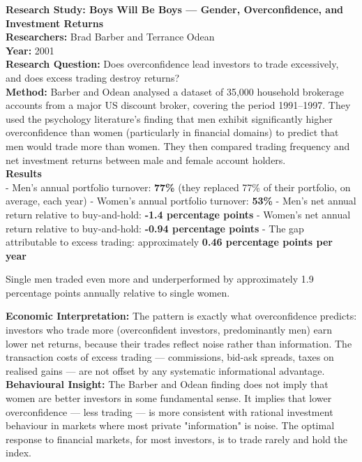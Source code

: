 \documentclass[12pt, letterpaper]{article}
\begin{document}
\begin{researchbox}
\textbf{Research Study: Boys Will Be Boys --- Gender, Overconfidence, and Investment Returns}\\[4pt]

\textbf{Researchers:} Brad Barber and Terrance Odean\\[4pt]
\textbf{Year:} 2001\\[4pt]
\textbf{Research Question:} Does overconfidence lead investors to trade excessively, and does excess trading destroy returns?\\[4pt]
\textbf{Method:} Barber and Odean analysed a dataset of 35,000 household brokerage accounts from a major US discount broker, covering the period 1991--1997. They used the psychology literature's finding that men exhibit significantly higher overconfidence than women (particularly in financial domains) to predict that men would trade more than women. They then compared trading frequency and net investment returns between male and female account holders.\\[4pt]
\textbf{Results}\\[4pt]
- Men's annual portfolio turnover: \textbf{77\%} (they replaced 77\% of their portfolio, on average, each year)
- Women's annual portfolio turnover: \textbf{53\%}
- Men's net annual return relative to buy-and-hold: \textbf{-1.4 percentage points}
- Women's net annual return relative to buy-and-hold: \textbf{-0.94 percentage points}
- The gap attributable to excess trading: approximately \textbf{0.46 percentage points per year}

Single men traded even more and underperformed by approximately 1.9 percentage points annually relative to single women.

\textbf{Economic Interpretation:} The pattern is exactly what overconfidence predicts: investors who trade more (overconfident investors, predominantly men) earn lower net returns, because their trades reflect noise rather than information. The transaction costs of excess trading --- commissions, bid-ask spreads, taxes on realised gains --- are not offset by any systematic informational advantage.\\[4pt]

\textbf{Behavioural Insight:} The Barber and Odean finding does not imply that women are better investors in some fundamental sense. It implies that lower overconfidence --- less trading --- is more consistent with rational investment behaviour in markets where most private "information" is noise. The optimal response to financial markets, for most investors, is to trade rarely and hold the index.\\[4pt]
\end{researchbox}
\end{document}
